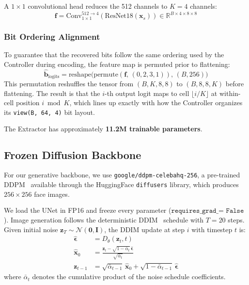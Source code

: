 \documentclass[conference]{IEEEtran}
\newcommand{\R}{\mathbb{R}}
\newcommand{\Ncal}{\mathcal{N}}
\begin{document}
A $1\times1$ convolutional head reduces the 512 channels to $K = 4$ channels:
\begin{equation}
    \mathbf{f} = \text{Conv}_{1\times1}^{512 \to 4}(\text{ResNet18}(\mathbf{x}_s)) \in \R^{B \times 4 \times 8 \times 8}
    \label{eq:extractor_head}
\end{equation}

\subsubsection{Bit Ordering Alignment}
To guarantee that the recovered bits follow the same ordering used by the Controller during encoding, the feature map is permuted prior to flattening:
\begin{equation}
    \hat{\mathbf{b}}_\text{logits} = \text{reshape}\big(\text{permute}(\mathbf{f},\, (0,2,3,1)),\, (B, 256)\big)
    \label{eq:permute}
\end{equation}
This permutation reshuffles the tensor from $(B, K, 8, 8)$ to $(B, 8, 8, K)$ before flattening. The result is that the $i$-th output logit maps to cell $\lfloor i/K \rfloor$ at within-cell position $i \bmod K$, which lines up exactly with how the Controller organizes its \texttt{view(B, 64, 4)} bit layout.

The Extractor has approximately \textbf{11.2M trainable parameters}.

\subsection{Frozen Diffusion Backbone}
\label{sec:diffusion}

For our generative backbone, we use \texttt{google/ddpm-celebahq-256}, a pre-trained DDPM~\cite{ho2020denoising} available through the HuggingFace \texttt{diffusers} library, which produces $256\times256$ face images.

We load the UNet in FP16 and freeze every parameter ($\texttt{requires\_grad\_ = False}$).
Image generation follows the deterministic DDIM~\cite{song2020denoising} schedule with $T = 20$ steps.
Given initial noise $\mathbf{z}_T \sim \Ncal(\mathbf{0}, \mathbf{I})$, the DDIM update at step $i$ with timestep $t$ is:
\begin{align}
    \hat{\bm{\epsilon}} &= D_\theta(\mathbf{z}_t, t) \label{eq:noise_pred} \\
    \hat{\mathbf{x}}_0 &= \frac{\mathbf{z}_t - \sqrt{1 - \bar{\alpha}_t}\, \hat{\bm{\epsilon}}}{\sqrt{\bar{\alpha}_t}} \label{eq:x0_pred} \\
    \mathbf{z}_{t-1} &= \sqrt{\bar{\alpha}_{t-1}}\, \hat{\mathbf{x}}_0 + \sqrt{1 - \bar{\alpha}_{t-1}}\, \hat{\bm{\epsilon}} \label{eq:ddim_step}
\end{align}
where $\bar{\alpha}_t$ denotes the cumulative product of the noise schedule coefficients.
\end{document}
